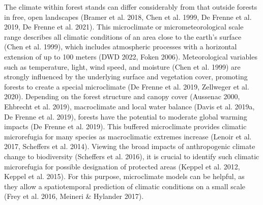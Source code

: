 \documentclass[5p]{elsarticle} %
\begin{document}
The climate within forest stands can differ considerably from that outside forests in free, open landscapes (Bramer et al. 2018, Chen et al. 1999, De Frenne et al. 2019, De Frenne et al. 2021). This microclimate or micrometeorological scale range describes all climatic conditions of an area close to the earth’s surface (Chen et al. 1999), which includes atmospheric processes with a horizontal extension of up to 100 meters (DWD 2022, Foken 2006). Meteorological variables such as temperature, light, wind speed, and moisture (Chen et al. 1999) are strongly influenced by the underlying surface and vegetation cover, promoting forests to create a special microclimate (De Frenne et al. 2019, Zellweger et al. 2020). Depending on the forest structure and canopy cover (Aussenac 2000, Ehbrecht et al. 2019), macroclimate and local water balance (Davis et al. 2019a, De Frenne et al. 2019), forests have the potential to moderate global warming impacts (De Frenne et al. 2019). This buffered microclimate provides climatic microrefugia for many species as macroclimatic extremes increase (Lenoir et al. 2017, Scheffers et al. 2014). Viewing the broad impacts of anthropogenic climate change to biodiversity (Scheffers et al. 2016), it is crucial to identify such climatic microrefugia for possible designation of protected areas (Keppel et al. 2012, Keppel et al. 2015). For this purpose, microclimate models can be helpful, as they allow a spatiotemporal prediction of climatic conditions on a small scale (Frey et al. 2016, Meineri \& Hylander 2017).\\
\end{document}

